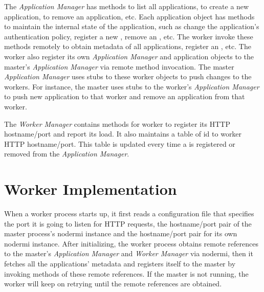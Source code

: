 The \emph{Application Manager} has
methods to list all applications, to create a new application, to  remove an
application, etc. Each application object has methods to maintain the internal
state of the application, such as change the application's authentication
policy, register a new \appins, remove an \appins, etc. The worker invoke
these methods remotely to obtain metadata of all applications, register an
\appins, etc. The worker also register its own \emph{Application Manager}  and
application objects to the master's \emph{Application Manager}  via remote
method invocation. The master \emph{Application Manager}  uses stubs to these
worker objects to push changes to the  workers. For instance, the master uses
stubs to the worker's \emph{Application Manager} to push new application to
that worker and remove an application from that worker.

The \emph{Worker Manager} contains methods for worker to register its HTTP
hostname/port and report its load. It also maintains a table of \appins{} id
to worker HTTP hostname/port. This table is updated every time a \appins{}
is registered or removed from the \emph{Application Manager}. 




\section{Worker Implementation}
\label{sec:worker}

When a worker process starts up, it first reads a configuration file that
specifies the port it is going to listen for HTTP requests,  the hostname/port
pair of the master process's nodermi instance   and the hostname/port pair for
its own nodermi instance. After initializing, the worker process obtains
remote references to the master's \emph{Application Manager} and \emph{Worker
Manager} via nodermi, then  it fetches all the applications' metadata and
registers itself to the master by invoking methods of these remote references.
If the master is not running, the worker will keep on retrying until the
remote references are obtained.

